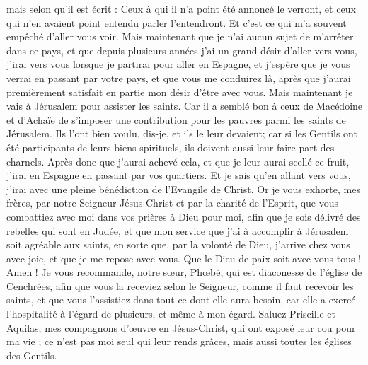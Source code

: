 \begin{multicols}{2}
mais selon qu'il est écrit : Ceux à qui il n'a point été annoncé le verront, et ceux qui n'en avaient point entendu parler l'entendront.
Et c'est ce qui m'a souvent empêché d'aller vous voir.
Mais maintenant que je n'ai aucun sujet de m'arrêter dans ce pays, et que depuis plusieurs années j'ai un grand désir d'aller vers vous,
j'irai vers vous lorsque je partirai pour aller en Espagne, et j'espère que je vous verrai en passant par votre pays, et que vous me conduirez là, après que j'aurai premièrement satisfait en partie mon désir d'être avec vous.
Mais maintenant je vais à Jérusalem pour assister les saints.
Car il a semblé bon à ceux de Macédoine et d'Achaïe de s'imposer une contribution pour les pauvres parmi les saints de Jérusalem.
Ils l'ont bien voulu, dis-je, et ils le leur devaient; car si les Gentils ont été participants de leurs biens spirituels, ils doivent aussi leur faire part des charnels.
Après donc que j'aurai achevé cela, et que je leur aurai scellé ce fruit, j'irai en Espagne en passant par vos quartiers.
Et je sais qu'en allant vers vous, j'irai avec une pleine bénédiction de l'Evangile de Christ.
Or je vous exhorte, mes frères, par notre Seigneur Jésus-Christ et par la charité de l'Esprit, que vous combattiez avec moi dans vos prières à Dieu pour moi,
afin que je sois délivré des rebelles qui sont en Judée, et que mon service que j'ai à accomplir à Jérusalem soit agréable aux saints,
en sorte que, par la volonté de Dieu, j'arrive chez vous avec joie, et que je me repose avec vous.
Que le Dieu de paix soit avec vous tous ! Amen !
\VerseOne{}Je vous recommande, notre sœur, Phœbé, qui est diaconesse de l'église de Cenchrées,
afin que vous la receviez selon le Seigneur, comme il faut recevoir les saints, et que vous l'assistiez dans tout ce dont elle aura besoin, car elle a exercé l'hospitalité à l'égard de plusieurs, et même à mon égard.
Saluez Priscille et Aquilas, mes compagnons d'œuvre en Jésus-Christ,
qui ont exposé leur cou pour ma vie ; ce n'est pas moi seul qui leur rends grâces, mais aussi toutes les églises des Gentils.

\end{multicols}
